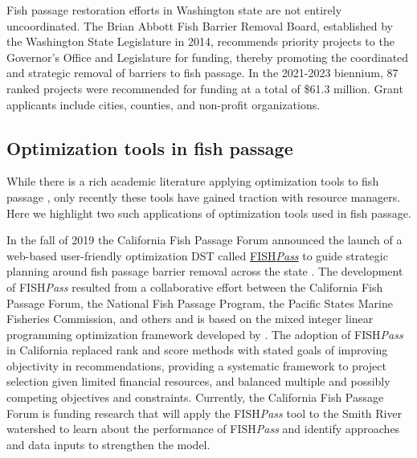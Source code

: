 \documentclass[12pt]{elsarticle}
\begin{document}
Fish passage restoration efforts in Washington state are not entirely uncoordinated. The Brian Abbott Fish Barrier Removal Board, established by the Washington State Legislature in 2014, recommends priority projects to the Governor's Office and Legislature for funding, thereby promoting the coordinated and strategic removal of barriers to fish passage. In the 2021-2023 biennium, 87 ranked projects were recommended for funding at a total of \$61.3 million. Grant applicants include cities, counties, and non-profit organizations. 


\subsection{Optimization tools in fish passage}

While there is a rich academic literature applying optimization tools to fish passage \citep{o2005optimizing, kuby2005multiobjective, mcmanamay2019commonalities, couto2021safeguarding}, only recently these tools have gained traction with resource managers. Here we highlight two such applications of optimization tools used in fish passage. 

In the fall of 2019 the California Fish Passage Forum announced the launch of a web-based user-friendly optimization DST called \href{https://fishpass.psmfc.org}{FISH\emph{Pass}} to guide strategic planning around fish passage barrier removal across the state \citep{optipass2015migratory}. The development of FISH\emph{Pass} resulted from a collaborative effort between the California Fish Passage Forum, the National Fish Passage Program, the Pacific States Marine Fisheries Commission, and others and is based on the mixed integer linear programming optimization framework developed by \citet{o2005optimizing}. The adoption of FISH\emph{Pass} in California replaced rank and score methods with stated goals of improving objectivity in recommendations, providing a systematic framework to project selection given limited financial resources, and balanced multiple and possibly competing objectives and constraints. Currently, the California Fish Passage Forum is funding research that will apply the FISH\emph{Pass} tool to the Smith River watershed to learn about the performance of FISH\emph{Pass} and identify approaches and data inputs to strengthen the model.\footnotemark{} 
\end{document}
